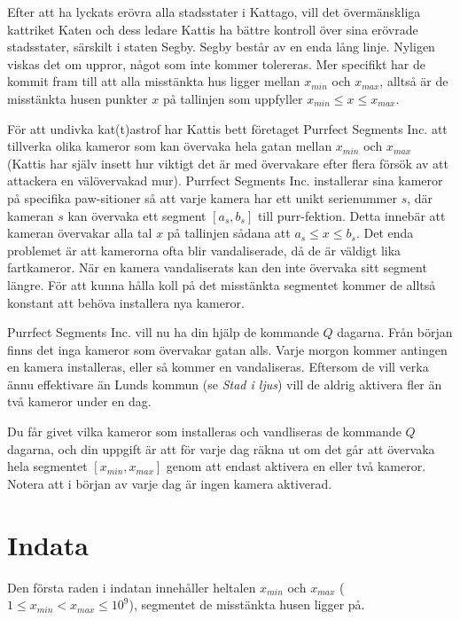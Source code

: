 
\noindent
Efter att ha lyckats erövra alla stadsstater i Kattago, vill det övermänskliga kattriket Katen
och dess ledare Kattis ha bättre kontroll över sina erövrade stadsstater, särskilt i staten Segby.
Segby består av en enda lång linje. Nyligen
viskas det om uppror, något som inte kommer tolereras. Mer specifikt har de kommit fram till
att alla misstänkta hus ligger mellan $x_{min}$ och $x_{max}$, alltså är de misstänkta husen
punkter $x$ på tallinjen som uppfyller $x_{min} \le x \le x_{max}$.


För att undivka kat(t)astrof har Kattis bett företaget Purrfect Segments Inc. att tillverka
olika kameror som kan övervaka hela gatan mellan $x_{min}$ och $x_{max}$ (Kattis har själv insett hur viktigt det är med övervakare 
efter flera försök av att attackera en välövervakad mur). 
Purrfect Segments Inc. installerar sina kameror på specifika paw-sitioner så att varje kamera har ett unikt serienummer $s$, 
där kameran $s$ kan övervaka ett segment $[a_s,b_s]$ till purr-fektion. 
Detta innebär att kameran övervakar alla tal $x$ på tallinjen sådana att $a_s \le x \le b_s$. 
Det enda problemet är att kamerorna ofta blir vandaliserade, då de är väldigt lika fartkameror.
När en kamera vandaliserats kan den inte övervaka sitt segment längre. För att kunna hålla
koll på det misstänkta segmentet kommer de alltså konstant att behöva installera nya kameror.

Purrfect Segments Inc. vill nu ha din hjälp de kommande $Q$ dagarna. Från början finns det inga kameror som övervakar gatan alls. 
Varje morgon kommer antingen en kamera installeras, eller så kommer en vandaliseras. 
Eftersom de vill verka ännu effektivare än Lunds kommun (se \textit{Stad i ljus}) vill de aldrig aktivera fler än två
kameror under en dag. 

Du får givet vilka kameror som installeras och vandliseras de kommande $Q$ dagarna, 
och din uppgift är att för varje dag räkna ut om det går att övervaka hela segmentet $[x_{min}, x_{max}]$ genom att endast aktivera en eller två kameror. 
Notera att i början av varje dag är ingen kamera aktiverad. 


\section*{Indata}
Den första raden i indatan innehåller heltalen $x_{min}$ och $x_{max}$ ($1 \leq x_{min} < x_{max} \leq 10^9$),
segmentet de misstänkta husen ligger på.


